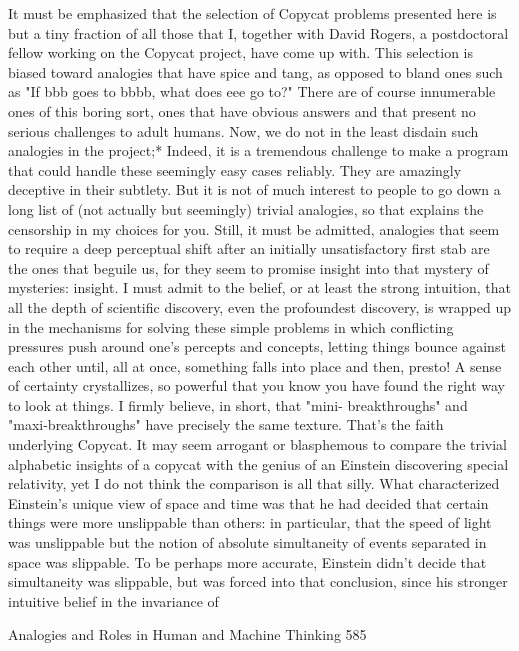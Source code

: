         It must be emphasized that the selection of Copycat problems presented here is
but a tiny fraction of all those that I, together with David Rogers, a postdoctoral
fellow working on the Copycat project, have come up with. This selection is biased
toward analogies that have spice and tang, as opposed to bland ones such as "If bbb
goes to bbbb, what does eee go to?" There are of course innumerable ones of this
boring sort, ones that have obvious answers and that present no serious challenges to
adult humans.
        Now, we do not in the least disdain such analogies in the project;* Indeed, it is
a tremendous challenge to make a program that could handle these seemingly easy
cases reliably. They are amazingly deceptive in their subtlety. But it is not of much
interest to people to go down a long list of (not actually but seemingly) trivial
analogies, so that explains the censorship in my choices for you.
        Still, it must be admitted, analogies that seem to require a deep perceptual shift
after an initially unsatisfactory first stab are the ones that beguile us, for they seem to
promise insight into that mystery of mysteries: insight. I must admit to the belief, or at
least the strong intuition, that all the depth of scientific discovery, even the
profoundest discovery, is wrapped up in the mechanisms for solving these simple
problems in which conflicting pressures push around one's percepts and concepts,
letting things bounce against each other until, all at once, something falls into place
and then, presto! A sense of certainty crystallizes, so powerful that you know you
have found the right way to look at things. I firmly believe, in short, that "mini-
breakthroughs" and "maxi-breakthroughs" have precisely the same texture. That's the
faith underlying Copycat.
        It may seem arrogant or blasphemous to compare the trivial alphabetic insights
of a copycat with the genius of an Einstein discovering special relativity, yet I do not
think the comparison is all that silly. What characterized Einstein's unique view of
space and time was that he had decided that certain things were more unslippable than
others: in particular, that the speed of light was unslippable but the notion of absolute
simultaneity of events separated in space was slippable. To be perhaps more accurate,
Einstein didn't decide that simultaneity was slippable, but was forced into that
conclusion, since his stronger intuitive belief in the invariance of




Analogies and Roles in Human and Machine Thinking                                      585

